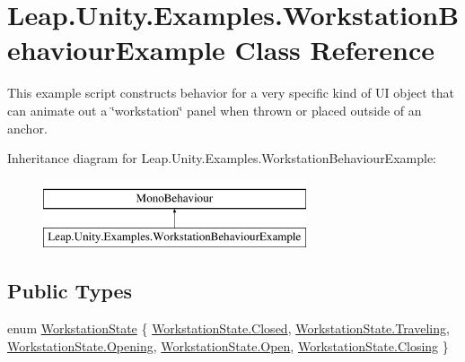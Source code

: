 \hypertarget{class_leap_1_1_unity_1_1_examples_1_1_workstation_behaviour_example}{}\section{Leap.\+Unity.\+Examples.\+Workstation\+Behaviour\+Example Class Reference}
\label{class_leap_1_1_unity_1_1_examples_1_1_workstation_behaviour_example}


This example script constructs behavior for a very specific kind of UI object that can animate out a \char`\"{}workstation\char`\"{} panel when thrown or placed outside of an anchor.  


Inheritance diagram for Leap.\+Unity.\+Examples.\+Workstation\+Behaviour\+Example\+:\begin{figure}[H]
\begin{center}
\leavevmode
\includegraphics[height=2.000000cm]{class_leap_1_1_unity_1_1_examples_1_1_workstation_behaviour_example}
\end{center}
\end{figure}
\subsection*{Public Types}
\begin{DoxyCompactItemize}
\item 
enum \mbox{\hyperlink{class_leap_1_1_unity_1_1_examples_1_1_workstation_behaviour_example_ae21c3ce4f1aac3e1920073e0e674cbcc}{Workstation\+State}} \{ \newline
\mbox{\hyperlink{class_leap_1_1_unity_1_1_examples_1_1_workstation_behaviour_example_ae21c3ce4f1aac3e1920073e0e674cbcca03f4a47830f97377a35321051685071e}{Workstation\+State.\+Closed}}, 
\mbox{\hyperlink{class_leap_1_1_unity_1_1_examples_1_1_workstation_behaviour_example_ae21c3ce4f1aac3e1920073e0e674cbcca534ae0202dfc1e2f430fe1a1e7fb1dc7}{Workstation\+State.\+Traveling}}, 
\mbox{\hyperlink{class_leap_1_1_unity_1_1_examples_1_1_workstation_behaviour_example_ae21c3ce4f1aac3e1920073e0e674cbcca9bd99a0beea48f10663fc4a7d7a33140}{Workstation\+State.\+Opening}}, 
\mbox{\hyperlink{class_leap_1_1_unity_1_1_examples_1_1_workstation_behaviour_example_ae21c3ce4f1aac3e1920073e0e674cbccac3bf447eabe632720a3aa1a7ce401274}{Workstation\+State.\+Open}}, 
\newline
\mbox{\hyperlink{class_leap_1_1_unity_1_1_examples_1_1_workstation_behaviour_example_ae21c3ce4f1aac3e1920073e0e674cbcca5c8de6f894682fdb1786037b2040a26e}{Workstation\+State.\+Closing}}
 \}
\end{DoxyCompactItemize}
